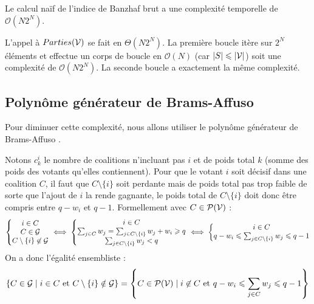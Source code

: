 \begin{proposition}
	Le calcul naïf de l'indice de Banzhaf brut a une complexité temporelle de $\mathcal{O}(N 2^N)$.
\end{proposition}

L'appel à $Parties(\mathcal{V})$ se fait en $\Theta(N 2^N)$.
La première boucle itère sur $2^N$ éléments et effectue un corps de boucle en $\mathcal{O}(N)$ (car $|S| \leqslant |\mathcal{V}|$) soit une complexité de $\mathcal{O}(N 2^N)$. La seconde boucle a exactement la même complexité.


\subsection{Polynôme générateur de Brams-Affuso}

Pour diminuer cette complexité, nous allons utiliser le polynôme générateur de Brams-Affuso \cite{power_european_constitution}.

Notons $c_k^i$ le nombre de coalitions n'incluant pas $i$ et de poids total $k$ (somme des poids des votants qu'elles contiennent).
Pour que le votant $i$ soit décisif dans une coalition $C$, il faut que $C \setminus \{i\}$ soit perdante mais de poids total pas trop faible de sorte que l'ajout de $i$ la rende gagnante, le poids total de $C \setminus \{i\}$ doit donc être compris entre $q - w_i$ et $q - 1$. Formellement avec $C \in \mathcal{P}(\mathcal{V})$ :
\begin{equation*}
	\left\{ \begin{matrix}
		i \in C \\
		C \in \mathcal{G} \\
		C \setminus \{i\} \not\in \mathcal{G}
	\end{matrix} \right.
	\iff
	\left\{ \begin{matrix}
		i \in C \\
		\sum_{j \in C} w_j = \sum_{j \in C \setminus \{i\}} w_j + w_i \geqslant q \\
		\sum_{j \in C \setminus \{i\}} w_j < q
	\end{matrix} \right.
	\iff
	\left\{ \begin{matrix}
		i \in C \\
		q - w_i \leqslant \sum_{j \in C \setminus \{i\}} w_j \leqslant q - 1
	\end{matrix} \right.
\end{equation*}
On a donc l'égalité ensembliste :
\begin{equation*}
	\left\{ C \in \mathcal{G} \;|\; i \in C \text{ et } C \setminus \{i\} \notin \mathcal{G} \right\}
	= \left\{ C \in \mathcal{P}(\mathcal{V}) \;|\; i \not\in C \text{ et } q - w_i \leqslant \sum_{j \in C} w_j \leqslant q - 1 \right\}
\end{equation*}

